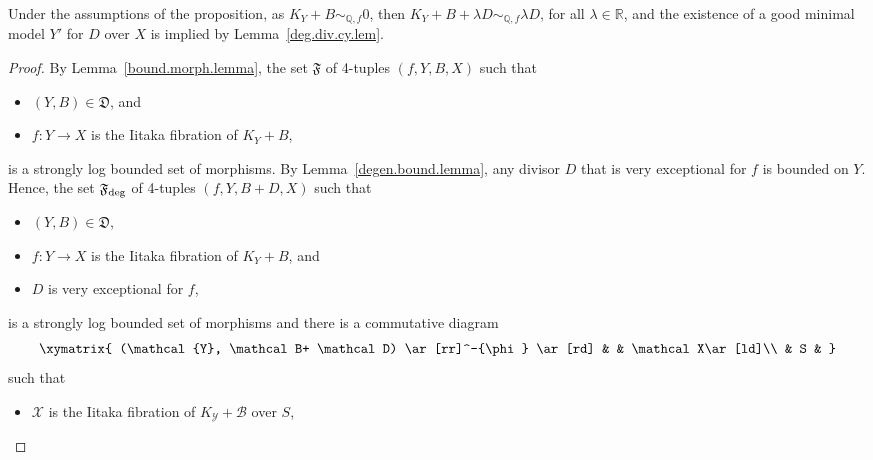 \documentclass[11pt]{ip-journal}
\theoremstyle{definition}
\begin{document}
Under the assumptions of the proposition, as $K_Y+B \sim_{\mathbb{Q}, f} 0$, then $K_Y+B+ \lambda D \sim_{\mathbb{Q}, f} \lambda D$, for all $\lambda \in \mathbb{R}$, and the existence of a good minimal model $Y'$ for $D$ over $X$ is implied by Lemma~\ref{deg.div.cy.lem}.

\begin{proof}
By Lemma~\ref{bound.morph.lemma}, the set 
$\mathfrak F$ 
of 4-tuples 
$(f, Y, B, X)$ 
such that  
\begin{itemize}
    \item 
$(Y, B) \in \mathfrak D$, 
and

    \item 
$f \colon Y \to X$ 
is the Iitaka fibration of 
$K_Y+B$, 
\end{itemize}
is a strongly log bounded set of morphisms.
By Lemma~\ref{degen.bound.lemma}, any divisor 
$D$ 
that is very exceptional for 
$f$ 
is bounded on 
$Y$. 
Hence, the set 
$\mathfrak{F}_{\rm{deg}}$ 
of 4-tuples 
$(f, Y, B+D, X)$ 
such that
\begin{itemize}
    \item 
$(Y, B) \in \mathfrak D$,

    \item 
$f \colon Y \to X$ 
is the Iitaka fibration of 
$K_Y+B$, 
and

    \item 
$D$ 
is very exceptional for 
$f$,
\end{itemize}
is a strongly log bounded set of morphisms and there is a commutative diagram
\begin{align}
\label{diag.bound.fam.proof.eqn}
    \xymatrix{
    (\mathcal{Y}, \mathcal B+ \mathcal D) 
    \ar[rr]^-{\phi} \ar[rd] &
    & \mathcal X\ar[ld]\\
    & S &
    }
\end{align}
such that 
\begin{itemize}
\item 
$\mathcal X$ 
is the Iitaka fibration of 
$K_\mathcal{Y}+\mathcal{B}$ 
over 
$S$,


\end{itemize}
\end{proof}
\end{document}

